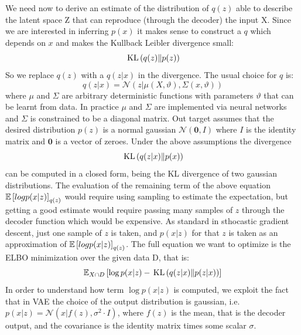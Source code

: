 
We need now to derive an estimate of the distribution of $q(z)$ able to describe the latent space Z that can reproduce (through the decoder) the input X. Since we are interested in inferring $p(x)$ it makes sense to construct a $q$ which depends on $x$ and makes the Kullback Leibler divergence small:
\begin{equation}
  \,\mathrm{KL}\left( q(z)\lVert p(z) \right) 
\end{equation}
So we replace $q(z)$ with a $q(z|x)$ in the divergence. The usual choice for $q$ is:
\begin{equation}
    q(z|x) = \mathcal{N}(z| \mu(X,\vartheta), \Sigma(x,\vartheta))
\end{equation}
where $\mu$ and $\Sigma$ are arbitrary deterministic functions with parameters $\vartheta$ that can be learnt from data.
In practice $\mu$ and $\Sigma$ are implemented via neural networks and $\Sigma$ is constrained to be a diagonal matrix.
Out target assumes that the desired distribution $p(z)$ is a normal gaussian $\mathcal{N}(\bm{0},I)$ where $I$ is the identity matrix and $\bm{0}$ is a vector of zeroes. Under the above assumptions the divergence $$  \,\mathrm{KL}\left( q(z|x)\lVert p(x) \right)  $$ can be computed in a closed form, being the KL divergence of two gaussian distributions.
The evaluation of the remaining term of the above equation  $ \mathbb{E} \left[ log p(x|z) \right]_{q(z)} $
would require using sampling to estimate the expectation, but getting a good estimate would require passing many samples of $z$ through the decoder function which would be expensive. 
As standard in sthocastic gradient descent, just one sample of $z$ is taken, and $p(x|z)$ for that $z$ is taken as an approximation of 
$\mathbb{E} \left[ log p(x|z) \right]_{q(z)}$.
The full equation we want to optimize is the ELBO minimization over the given data D, that is:
\begin{equation}
    \mathbb{E}_{X \cap D} \left[ \log p(x|z) -  \,\mathrm{KL}\left( q(z|x)\lVert p(z|x) \right)  \right]
\end{equation}
In order to understand how term $\log p(x|z)$ is computed, we exploit the fact that in VAE the choice of the output distribution is gaussian, 
i.e. $ p(x|z) = \mathcal{N}(x|f(z), \sigma^2 \cdot I ) $, where $f(z)$ is the mean, that is the decoder output, and the covariance is the identity matrix times some scalar $\sigma$.


